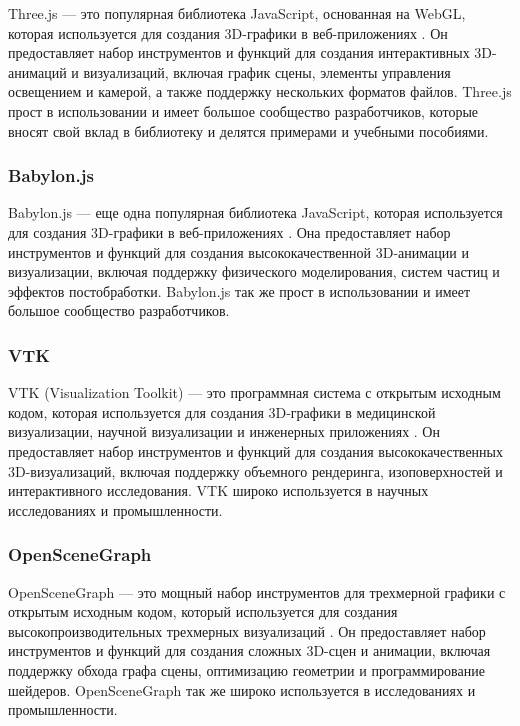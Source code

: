 Three.js — это популярная библиотека JavaScript, основанная на WebGL, которая используется для создания 3D-графики в веб-приложениях \cite{Threejs_offc} . Он предоставляет набор инструментов и функций для создания интерактивных 3D-анимаций и визуализаций, включая график сцены, элементы управления освещением и камерой, а также поддержку нескольких форматов файлов. Three.js прост в использовании и имеет большое сообщество разработчиков, которые вносят свой вклад в библиотеку и делятся примерами и учебными пособиями. \cite{ThreejsFramework}

\subsubsection{Babylon.js}

Babylon.js — еще одна популярная библиотека JavaScript, которая используется для создания 3D-графики в веб-приложениях \cite{Babylonjs_offc}. Она предоставляет набор инструментов и функций для создания высококачественной 3D-анимации и визуализации, включая поддержку физического моделирования, систем частиц и эффектов постобработки. Babylon.js так же прост в использовании и имеет большое сообщество разработчиков. 

\subsubsection{VTK}

VTK (Visualization Toolkit) — это программная система с открытым исходным кодом, которая используется для создания 3D-графики в медицинской визуализации, научной визуализации и инженерных приложениях \cite{VTK_offc}. Он предоставляет набор инструментов и функций для создания высококачественных 3D-визуализаций, включая поддержку объемного рендеринга, изоповерхностей и интерактивного исследования. VTK широко используется в научных исследованиях и промышленности.

\subsubsection{OpenSceneGraph}

OpenSceneGraph — это мощный набор инструментов для трехмерной графики с открытым исходным кодом, который используется для создания высокопроизводительных трехмерных визуализаций \cite{OpenSceneGraph_offc}. Он предоставляет набор инструментов и функций для создания сложных 3D-сцен и анимации, включая поддержку обхода графа сцены, оптимизацию геометрии и программирование шейдеров. OpenSceneGraph так же широко используется в исследованиях и промышленности. 

